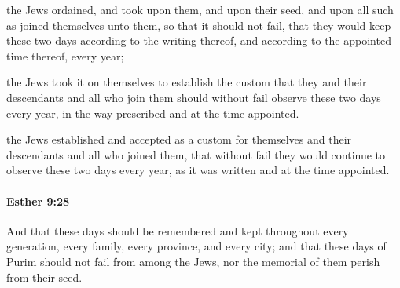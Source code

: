 			\begin{versebox}
					\item[BHS] 
					\item[LXX] 
					\item[ASV] the Jews ordained, and took upon them, and upon their seed, and upon all such as joined themselves unto them, so that it should not fail, that they would keep these two days according to the writing thereof, and according to the appointed time thereof, every year;
					\item[NIV] the Jews took it on themselves to establish the custom that they and their descendants and all who join them should without fail observe these two days every year, in the way prescribed and at the time appointed.
					\item[NRSV] the Jews established and accepted as a custom for themselves and their descendants and all who joined them, that without fail they would continue to observe these two days every year, as it was written and at the time appointed.
			\end{versebox}

		\paragraph{Esther 9:28} %
			\label{ESTHER-9-28}

			And that these days should be remembered and kept throughout every generation, every family, every province, and every city; and that these days of Purim should not fail from among the Jews, nor the memorial of them perish from their seed.

